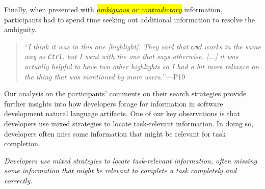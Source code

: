 Finally, when presented with \hl{\textit{ambiguous or contradictory}} information, participants had to spend time seeking out additional information to resolve the ambiguity.


\smallskip
\begin{footnotesize}
\begin{quote}
    ``\textit{I think it was in this one [highlight]. They said that \texttt{cmd} works in the same way as \texttt{Ctrl}, but I went with the one that says otherwise. [...] it was actually helpful to have two other highlights so I had a bit more reliance on the thing that was mentioned by more users.}''---P19
\end{quote}
\end{footnotesize}



Our analysis on the participants' comments on their search strategies provide further insights into how developers forage for information in software development natural language artifacts. One of our key observations is that  developers use mixed strategies to locate task-relevant information. In doing so, developers often miss some information that might be relevant for task completion.


\medskip
\begin{bluequote}
    \textit{Developers use mixed strategies to locate task-relevant information, often missing some information that might be relevant to complete a task completely and correctly.}
\end{bluequote}

